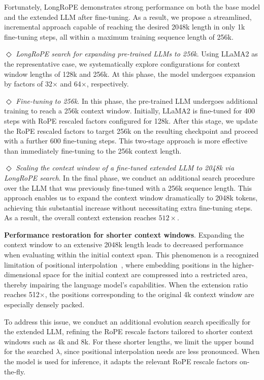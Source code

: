 Fortunately, LongRoPE demonstrates strong performance on both the base model and the extended LLM after fine-tuning. As a result, we propose a streamlined, incremental approach capable of reaching the desired 2048k length in only 1k fine-tuning steps, all within a maximum training sequence length of 256k.

$\Diamond$ \textit{LongRoPE search for expanding pre-trained LLMs to 256k}. Using LLaMA2 as the representative case, we systematically explore configurations for context window lengths of 128k and 256k. At this phase, the model undergoes expansion by factors of 32$\times$ and 64$\times$, respectively.

$\Diamond$ \textit{Fine-tuning to 256k}. In this phase, the pre-trained LLM undergoes additional training to reach a 256k context window. Initially, LLaMA2 is fine-tuned for 400 steps with RoPE rescaled factors configured for 128k. After this stage, we update the RoPE rescaled factors to target 256k on the resulting checkpoint and proceed with a further 600 fine-tuning steps. This two-stage approach is more effective than immediately fine-tuning to the 256k context length.

$\Diamond$ \textit{Scaling the context window of a fine-tuned extended LLM to 2048k via LongRoPE search}. In the final phase, we conduct an additional search procedure over the LLM that was previously fine-tuned with a 256k sequence length. This approach enables us to expand the context window dramatically to 2048k tokens, achieving this substantial increase without necessitating extra fine-tuning steps. As a result, the overall context extension reaches $512\times$.

\textbf{Performance restoration for shorter context windows}. Expanding the context window to an extensive 2048k length leads to decreased performance when evaluating within the initial context span. This phenomenon is a recognized limitation of positional interpolation~\cite{pi}, where embedding positions in the higher-dimensional space for the initial context are compressed into a restricted area, thereby impairing the language model’s capabilities. When the extension ratio reaches 512$\times$, the positions corresponding to the original 4k context window are especially densely packed.

To address this issue, we conduct an additional evolution search specifically for the extended LLM, refining the RoPE rescale factors tailored to shorter context windows such as 4k and 8k. For these shorter lengths, we limit the upper bound for the searched $\lambda$, since positional interpolation needs are less pronounced. When the model is used for inference, it adapts the relevant RoPE rescale factors on-the-fly.

